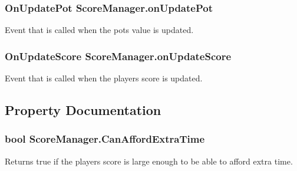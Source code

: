\subsubsection[{\texorpdfstring{on\+Update\+Pot}{onUpdatePot}}]{\setlength{\rightskip}{0pt plus 5cm}On\+Update\+Pot Score\+Manager.\+on\+Update\+Pot}\hypertarget{class_score_manager_a2df09d1f61b32b83a80c78d63f94689b}{}\label{class_score_manager_a2df09d1f61b32b83a80c78d63f94689b}


Event that is called when the pot\textquotesingle{}s value is updated. 

\subsubsection[{\texorpdfstring{on\+Update\+Score}{onUpdateScore}}]{\setlength{\rightskip}{0pt plus 5cm}On\+Update\+Score Score\+Manager.\+on\+Update\+Score}\hypertarget{class_score_manager_a54ededdc900a0c1982c25ab9ca984bed}{}\label{class_score_manager_a54ededdc900a0c1982c25ab9ca984bed}


Event that is called when the player\textquotesingle{}s score is updated. 



\subsection{Property Documentation}
\subsubsection[{\texorpdfstring{Can\+Afford\+Extra\+Time}{CanAffordExtraTime}}]{\setlength{\rightskip}{0pt plus 5cm}bool Score\+Manager.\+Can\+Afford\+Extra\+Time\hspace{0.3cm}{\ttfamily [get]}}\hypertarget{class_score_manager_a45b9f26bc13807ae1733feea8a5c7349}{}\label{class_score_manager_a45b9f26bc13807ae1733feea8a5c7349}


Returns true if the player\textquotesingle{}s score is large enough to be able to afford extra time. 

